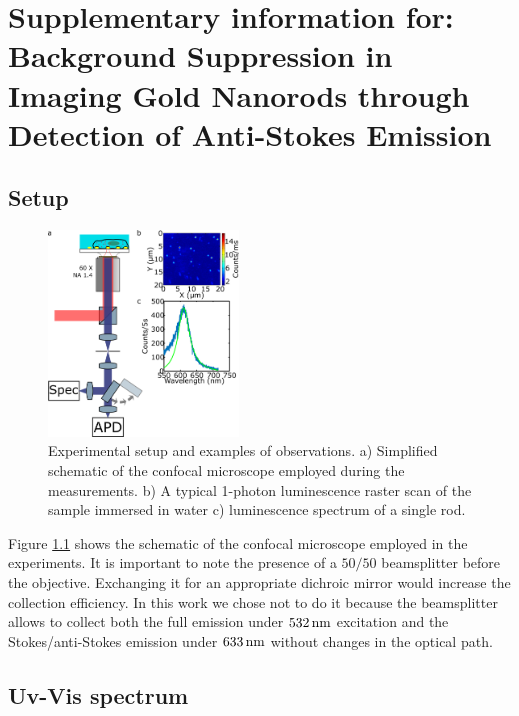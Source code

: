 \chapter[Bacgkround-Free Imaging]{Supplementary information for: Background Suppression in Imaging Gold
Nanorods through Detection of Anti-Stokes Emission}
\label{ch:SImaging}

\newpage

\section{Setup}

\begin{figure}[htp]
 \centering
 \includegraphics[width=0.45\textwidth]{Chapters/03_Background_Free/Figures/Supplementary/01_Setup/setup_1.png}
 \caption{Experimental setup and examples of observations. a) Simplified
 schematic of the confocal microscope employed during the measurements. b) A
 typical 1-photon luminescence raster scan of the sample immersed in water c)
 luminescence spectrum of a single rod.}
 \label{fig:confocal_setup}
\end{figure}

Figure \ref{fig:confocal_setup} shows the schematic of the confocal microscope
employed in the experiments. It is important to note the presence of a $50/50$
beamsplitter before the objective. Exchanging it for an appropriate dichroic
mirror would increase the collection efficiency. In this work we chose not to do
it because the beamsplitter allows to collect both the full emission under
$532\,\textrm{nm}$ excitation and the Stokes/anti-Stokes emission under $633\,\textrm{nm}$ without
changes in the optical path. 

\newpage

\section{Uv-Vis spectrum}

